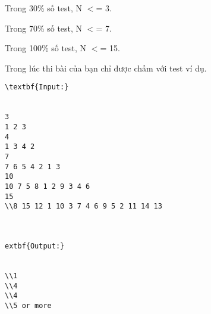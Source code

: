Trong 30\% số test, N $<$= 3.

Trong 70\% số test, N $<$= 7.

Trong 100\% số test, N $<$= 15.

Trong lúc thi bài của bạn chỉ được chấm với test ví dụ.
\begin{verbatim}
\textbf{Input:}


3
1 2 3
4
1 3 4 2
7
7 6 5 4 2 1 3
10
10 7 5 8 1 2 9 3 4 6
15
\\8 15 12 1 10 3 7 4 6 9 5 2 11 14 13



extbf{Output:}


\\1
\\4
\\4
\\5 or more \end{verbatim}